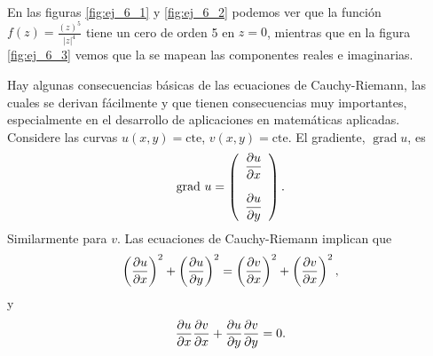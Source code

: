 \begin{Ejem}
	En las figuras \ref{fig:ej_6_1} y \ref{fig:ej_6_2} podemos ver que la función $f(z)=\frac{(z)^5}{|z|^4}$ tiene un cero de orden 5 en $z=0$, mientras que en la figura \ref{fig:ej_6_3} vemos que la se mapean las componentes reales e imaginarias.
\end{Ejem} 

Hay algunas consecuencias básicas de las ecuaciones de Cauchy-Riemann, las cuales se derivan fácilmente y que tienen consecuencias muy importantes, especialmente en el desarrollo de aplicaciones en matemáticas aplicadas.\\
Considere las curvas $u(x,y)=\mbox{cte}$, $v(x,y)=\mbox{cte}$. El gradiente, $\operatorname{grad } u$, es
\[
	\mbox{grad } u=\left(\begin{array}{c}
		\dfrac{\partial u}{\partial x}\\\\
		\dfrac{\partial u}{\partial y}
	\end{array}\right).
\]
Similarmente para $v$. Las ecuaciones de Cauchy-Riemann implican que 
$$\left(\dfrac{\partial u}{\partial x}\right)^2+\left(\dfrac{\partial u}{\partial y}\right)^2=\left(\dfrac{\partial v}{\partial x}\right)^2+\left(\dfrac{\partial v}{\partial x}\right)^2,$$
y $$\dfrac{\partial u}{\partial x}\dfrac{\partial v}{\partial x}+\dfrac{\partial u}{\partial y}\dfrac{\partial v}{\partial y}=0.$$

